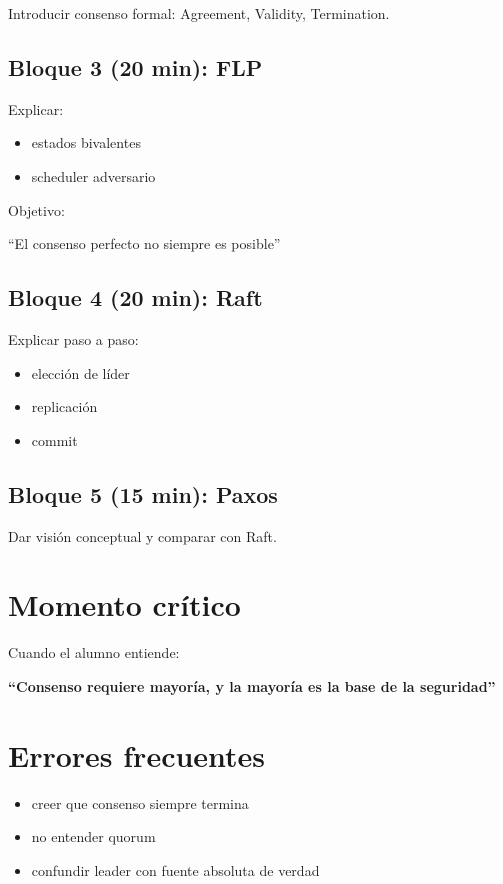 \documentclass[variant=docente,cover=institutional,mode=screen]{ua-engineering-v6-article}
\begin{document}
Introducir consenso formal:
Agreement, Validity, Termination.

\subsection*{Bloque 3 (20 min): FLP}

Explicar:
\begin{itemize}
\item estados bivalentes
\item scheduler adversario
\end{itemize}

Objetivo:
\begin{center}
“El consenso perfecto no siempre es posible”
\end{center}

\subsection*{Bloque 4 (20 min): Raft}

Explicar paso a paso:
\begin{itemize}
\item elección de líder
\item replicación
\item commit
\end{itemize}

\subsection*{Bloque 5 (15 min): Paxos}

Dar visión conceptual y comparar con Raft.

\section{Momento crítico}

Cuando el alumno entiende:

\begin{center}
\textbf{“Consenso requiere mayoría, y la mayoría es la base de la seguridad”}
\end{center}

\section{Errores frecuentes}

\begin{itemize}
\item creer que consenso siempre termina
\item no entender quorum
\item confundir leader con fuente absoluta de verdad
\end{itemize}
\end{document}
